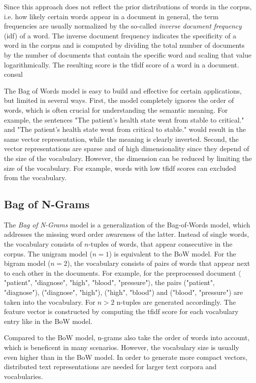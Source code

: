 Since this approach does not reflect the prior distributions of words in the corpus, i.e. how likely certain words appear in a document in general, the term frequencies are usually normalized by the so-called \textit{inverse document frequency} (idf) of a word.
The inverse document frequency indicates the specificity of a word in the corpus and is computed by dividing the total number of documents by the number of documents that contain the specific word and scaling that value logarithmically.
The resulting score is the tfidf score of a word in a document.
 consul

The Bag of Words model is easy to build and effective for certain applications, but limited in several ways.
First, the model completely ignores the order of words, which is often crucial for understanding the semantic meaning. For example, the sentences "The patient's health state went from stable to critical." and "The patient's health state went from critical to stable." would result in the same vector representation, while the meaning is clearly inverted.
Second, the vector representations are sparse and of high dimensionality since they depend of the size of the vocabulary.
However, the dimension can be reduced by limiting the size of the vocabulary. For example, words with low tfidf scores can excluded from the vocabulary.


\subsection{Bag of N-Grams}

The \textit{Bag of N-Grams} model is a generalization of the Bag-of-Words model, which addresses the missing word order awareness of the latter.
Instead of single words, the vocabulary consists of $n$-tuples of words, that appear consecutive in the corpus.
The unigram model ($n=1$) is equivalent to the BoW model.
For the bigram model ($n=2$), the vocabulary consists of pairs of words that appear next to each other in the documents.
For example, for the preprocessed document $\langle$"patient", "diagnose", "high", "blood", "pressure"$\rangle$, the pairs ("patient", "diagnose"), ("diagnose", "high"), ("high", "blood") and ("blood", "pressure") are taken into the vocabulary.
For $n>2$ n-tuples are generated accordingly.
The feature vector is constructed by computing the tfidf score for each vocabulary entry like in the BoW model.

Compared to the BoW model, n-grams also take the order of words into account, which is beneficent in many scenarios.
However, the vocabulary size is usually even higher than in the BoW model.
In order to generate more compact vectors, distributed text representations are needed for larger text corpora and vocabularies.

